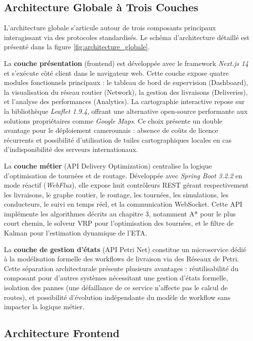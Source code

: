 \subsection{Architecture Globale à Trois Couches}

L'architecture globale s'articule autour de trois composants principaux interagissant via des protocoles standardisés. Le schéma d'architecture détaillé est présenté dans la figure \ref{fig:architecture_globale}.

La \textbf{couche présentation} (frontend) est développée avec le framework \textit{Next.js 14} et s'exécute côté client dans le navigateur web. Cette couche expose quatre modules fonctionnels principaux : le tableau de bord de supervision (Dashboard), la visualisation du réseau routier (Network), la gestion des livraisons (Deliveries), et l'analyse des performances (Analytics). La cartographie interactive repose sur la bibliothèque \textit{Leaflet 1.9.4}, offrant une alternative open-source performante aux solutions propriétaires comme \textit{Google Maps}. Ce choix présente un double avantage pour le déploiement camerounais : absence de coûts de licence récurrents et possibilité d'utilisation de tuiles cartographiques locales en cas d'indisponibilité des serveurs internationaux.

La \textbf{couche métier} (API Delivery Optimization) centralise la logique d'optimisation de tournées et de routage. Développée avec \textit{Spring Boot 3.2.2} en mode réactif (\textit{WebFlux}), elle expose huit contrôleurs REST gérant respectivement les livraisons, le graphe routier, le routage, les tournées, les simulations, les conducteurs, le suivi en temps réel, et la communication WebSocket. Cette API implémente les algorithmes décrits au chapitre 3, notamment A* pour le plus court chemin, le solveur VRP pour l'optimisation des tournées, et le filtre de Kalman pour l'estimation dynamique de l'ETA.

La \textbf{couche de gestion d'états} (API Petri Net) constitue un microservice dédié à la modélisation formelle des workflows de livraison via des Réseaux de Petri. Cette séparation architecturale présente plusieurs avantages : réutilisabilité du composant pour d'autres systèmes nécessitant une gestion d'états formelle, isolation des pannes (une défaillance de ce service n'affecte pas le calcul de routes), et possibilité d'évolution indépendante du modèle de workflow sans impacter la logique métier.

\subsection{Architecture Frontend}

